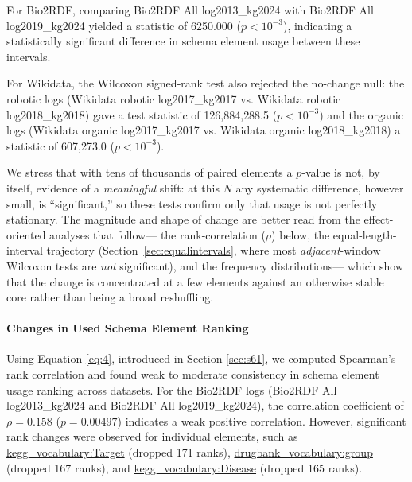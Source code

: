 \documentclass[sw]{iosart2x}
\providecommand{\DIFadd}[1]{{\protect\color{blue}\uwave{#1}}} %
\providecommand{\DIFdel}[1]{{\protect\color{red}\sout{#1}}} %
\providecommand{\DIFaddbegin}{} %
\providecommand{\DIFaddend}{} %
\providecommand{\DIFdelbegin}{} %
\providecommand{\DIFdelend}{} %
\providecommand{\DIFscaledelfig}{0.5}
\newlength{\DIFdelgraphicswidth} %
\newlength{\DIFdelgraphicsheight} %
\providecommand{\DIFaddincludegraphics}[2][]{{\color{blue}\fbox{\DIFOincludegraphics[#1]{#2}}}} %
\providecommand{\DIFdelincludegraphics}[2][]{%
\sbox{\DIFdelgraphicsbox}{\DIFOincludegraphics[#1]{#2}}%
\settoboxwidth{\DIFdelgraphicswidth}{\DIFdelgraphicsbox} %
\settoboxtotalheight{\DIFdelgraphicsheight}{\DIFdelgraphicsbox} %
\scalebox{\DIFscaledelfig}{%
\parbox[b]{\DIFdelgraphicswidth}{\usebox{\DIFdelgraphicsbox}\\[-\baselineskip] \rule{\DIFdelgraphicswidth}{0em}}\llap{\resizebox{\DIFdelgraphicswidth}{\DIFdelgraphicsheight}{%
\setlength{\unitlength}{\DIFdelgraphicswidth}%
\begin{picture}(1,1)%
\thicklines\linethickness{2pt} %
{\color[rgb]{1,0,0}\put(0,0){\framebox(1,1){}}}%
{\color[rgb]{1,0,0}\put(0,0){\line( 1,1){1}}}%
{\color[rgb]{1,0,0}\put(0,1){\line(1,-1){1}}}%
\end{picture}%
}\hspace*{3pt}}} %
} %
\DeclareRobustCommand{\DIFaddbegin}{\DIFOaddbegin \let\includegraphics\DIFaddincludegraphics} %
\DeclareRobustCommand{\DIFaddend}{\DIFOaddend \let\includegraphics\DIFOincludegraphics} %
\DeclareRobustCommand{\DIFdelbegin}{\DIFOdelbegin \let\includegraphics\DIFdelincludegraphics} %
\DeclareRobustCommand{\DIFdelend}{\DIFOaddend \let\includegraphics\DIFOincludegraphics} %
\begin{document}
For Bio2RDF, comparing Bio2RDF All log2013\_kg2024 with Bio2RDF All log2019\_kg2024 yielded a statistic of 6250.000 ($p < 10^{-3}$), indicating a statistically significant difference in schema element usage between these intervals.

For Wikidata, the Wilcoxon signed‐rank test also rejected the no-change null: the robotic logs (Wikidata robotic log2017\_kg2017 vs. Wikidata robotic log2018\_kg2018) gave a test statistic of 126{,}884{,}288.5 ($p < 10^{-3}$) and the organic logs (Wikidata organic log2017\_kg2017 vs. Wikidata organic log2018\_kg2018) a statistic of 607{,}273.0 ($p < 10^{-3}$).

We stress that with tens of thousands of paired elements a $p$-value is not, by itself, evidence of a \emph{meaningful} shift: at this $N$ any systematic difference, however small, is ``significant,'' so these tests confirm only that usage is not perfectly stationary. The magnitude and shape of change are better read from the effect-oriented analyses that follow\DIFdelbegin \DIFdel{--- }\DIFdelend \DIFaddbegin \DIFadd{: }\DIFaddend the rank-correlation ($\rho$) below, the equal-length-interval trajectory (Section~\ref{sec:equalintervals}, where most \emph{adjacent}-window Wilcoxon tests are \emph{not} significant), and the frequency distributions\DIFdelbegin \DIFdel{--- }\DIFdelend \DIFaddbegin \DIFadd{, }\DIFaddend which show that the change is concentrated at a few elements against an otherwise stable core rather than being a broad reshuffling.

\paragraph{\textbf{Changes in Used Schema Element Ranking}}
Using Equation \ref{eq:4}, introduced in Section \ref{sec:s61}, we computed Spearman's rank correlation and found weak to moderate consistency in schema element usage ranking across datasets. For the Bio2RDF logs (Bio2RDF All log2013\_kg2024 and Bio2RDF All log2019\_kg2024), the correlation coefficient of $\rho = 0.158$ ($p = 0.00497$) indicates a weak positive correlation. However, significant rank changes were observed for individual elements, such as \sloppy  %
\href{http://bio2rdf.org/kegg_vocabulary:Target}{kegg\_vocabulary:Target} (dropped 171 ranks), \href{http://bio2rdf.org/drugbank_vocabulary:group}{drugbank\_vocabulary:group} (dropped 167 ranks), and \href{http://bio2rdf.org/kegg_vocabulary:Disease}{kegg\_vocabulary:Disease} (dropped 165 ranks).
\end{document}
